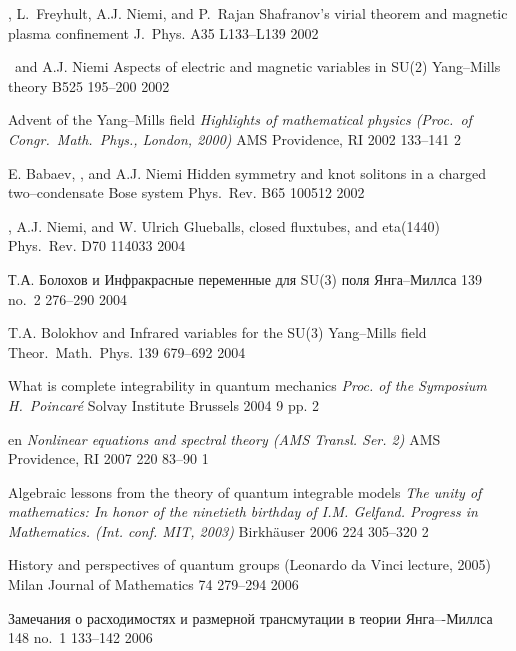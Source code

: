 {
{\LF, L.~Freyhult, A.J. Niemi, and P.~Rajan}
{Shafranov's virial theorem and magnetic plasma confinement}
{J.\ Phys.} {A35} {} {L133--L139} {2002}

{\LF\ and A.J. Niemi}
{Aspects of electric and magnetic variables in SU(2)
  Yang--Mills theory}
{\PL} {B525} {} {195--200} {2002}

{\LF}
{Advent of the Yang--Mills field}
{\em Highlights of mathematical physics
(Proc.\ of Congr.\ Math.\ Phys., London, 2000)}
{AMS} {Providence, RI}
{2002} {} {133--141} {2} {}

{E. Babaev, \LF, and A.J. Niemi}
{Hidden symmetry and knot solitons in a charged
two--condensate Bose system}
{Phys.\ Rev.} {B65} {} {100512} {2002}

{\LF, A.J. Niemi, and W. Ulrich}
{Glueballs, closed fluxtubes, and eta(1440)}
{Phys.\ Rev.} {D70} {} {114033} {2004}

{Т.А. Болохов и \LD}
{Инфракрасные переменные для SU(3) поля Янга--Миллса}
{\TMF} {139} {no.~2} {276--290} {2004}

{T.A. Bolokhov and \LF}
{Infrared variables for the SU(3) Yang--Mills field}
{Theor.\ Math.\ Phys.} {139} {679--692} {2004}

{\LF}
{What is complete integrability in quantum mechanics}
{\em Proc. of the Symposium H.~Poincar\'e}
{Solvay Institute} {Brussels} {2004} {} {9 pp.} {2} {}

{en}
{\em Nonlinear equations and spectral theory (AMS Transl. Ser. 2)}
{AMS} {Providence, RI} {2007} {220} {83--90} {1}


{\LF} 
{Algebraic lessons from the theory of quantum integrable models} 
{\em The unity of mathematics: In honor of the ninetieth 
birthday of I.M. Gelfand. Progress in Mathematics. (Int. conf. MIT, 2003)} 
{Birkh\"auser} {} {2006} {224} {305--320} {2} {}

{\LF}
{History and perspectives of quantum groups
 (Leonardo da Vinci lecture, 2005)}
{Milan Journal of Mathematics} {74} {} {279--294} {2006}

{\LD}
{Замечания о расходимостях и размерной трансмутации в теории Янга–-Миллса}
{\TMF} {148} {no.~1} {133--142} {2006}

}
